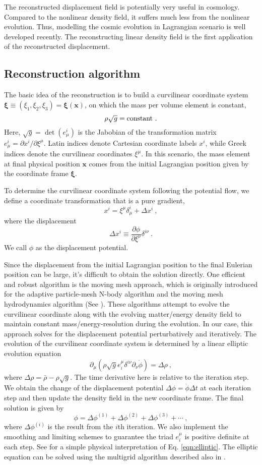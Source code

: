 \documentclass[iop]{emulateapj}
\newcommand{\be}{\begin{equation}}
\newcommand{\ee}{\end{equation}}
\newcommand{\vecx}{{\bm{x}}}
\newcommand{\vecxi}{{\bm{\xi}}}
\begin{document}
{The reconstructed displacement field is potentially very useful in cosmology.
Compared to the nonlinear density field, it suffers much less from the nonlinear evolution.
Thus, modelling the cosmic evolution in Lagrangian scenario is well developed recently.
The reconstructing linear density field is the first application of the reconstructed displacement.

\subsection{Reconstruction algorithm}
\label{sec:algorithm}

The basic idea of the reconstruction is to build a curvilinear coordinate system $\vecxi\equiv(\xi_1,\xi_2,
\xi_3)=\vecxi(\vecx)$, on which the mass per volume element is constant,
\be
\rho\sqrt{g}={\rm constant}\ .
\ee
Here, $\sqrt{g}=\det(e^i_\mu)$ is the Jabobian of the transformation matrix $e^i_\mu=\partial x^i/\partial\xi^\mu$.
Latin indices denote Cartesian coordinate labels $x^i$, while Greek indices denote the curvilinear coordinates $\xi^\mu$.
In this scenario, the mass element at final physical position $\vecx$ comes from the initial Lagrangian position given by the coordinate frame $\vecxi$.

To determine the curvilinear coordinate system following the potential flow, we define a coordinate transformation that is a pure gradient,
\be
x^i=\xi^\mu\delta_\mu^i+\Delta x^i\ ,
\ee
where the displacement
\be
\Delta x^i\equiv\frac{\partial\phi}{\partial\xi^\nu}\delta^{i\nu}\ .
\ee
We call $\phi$ as the displacement potential.

Since the displacement from the initial Lagrangian position to the final Eulerian position can be large,
it's difficult to obtain the solution directly.
One efficient and robust algorithm is the moving mesh approach, which is originally introduced for the adaptive particle-mesh N-body algorithm and the moving mesh hydrodynamics algorithm (See \cite{Pen95,Pen98}).
These algorithms attempt to evolve the curvilinear coordinate along with the evolving matter/energy density field to maintain constant mass/energy-resolution during the evolution.
In our case, this approach solves for the displacement potential perturbatively and iteratively.
The evolution of the curvilinear coordinate system is determined by a linear elliptic evolution equation
\be
\partial_\mu(\rho\sqrt{g}e^\mu_i\delta^{i\nu}\partial_\nu\dot\phi)=\Delta\rho\ ,
\label{eqn:elliptic}
\ee
where $\Delta\rho=\bar\rho-\rho\sqrt{g}$.
The time derivative here is relative to the iteration step.
We obtain the change of the displacement potential $\Delta\phi=\dot\phi\Delta t$ at each iteration step and then update the density field in the new coordinate frame.
The final solution is given by 
\be
\phi=\Delta\phi^{(1)}+\Delta\phi^{(2)}+\Delta\phi^{(3)}+\cdots\ ,
\ee
where $\Delta\phi^{(i)}$ is the result from the $i$th iteration.
We also implement the smoothing and limiting schemes to guarantee the triad $e^\mu_i$ is positive definite at each step.
See \cite{Pen95} for a simple physical interpretation of Eq. \ref{eqn:elliptic}.
The elliptic equation can be solved using the multigrid algorithm described also in \cite{Pen95}.

}
\end{document}

